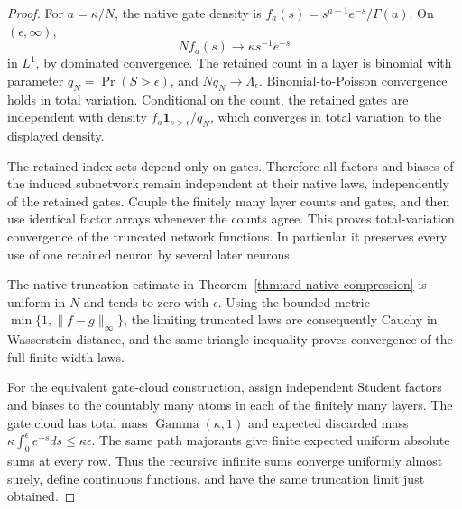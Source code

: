 \begin{proof}
For $a=\kappa/N$, the native gate density is
$f_a(s)=s^{a-1}e^{-s}/\Gamma(a)$. On $(\epsilon,\infty)$,
\[
 Nf_a(s)\longrightarrow\kappa s^{-1}e^{-s}
\]
in $L^1$, by dominated convergence. The retained count in a layer is binomial with parameter $q_N=\Pr(S>\epsilon)$, and $Nq_N\to\Lambda_\epsilon$. Binomial-to-Poisson convergence holds in total variation. Conditional on the count, the retained gates are independent with density $f_a\mathbf1_{s>\epsilon}/q_N$, which converges in total variation to the displayed density.

The retained index sets depend only on gates. Therefore all factors and biases of the induced subnetwork remain independent at their native laws, independently of the retained gates. Couple the finitely many layer counts and gates, and then use identical factor arrays whenever the counts agree. This proves total-variation convergence of the truncated network functions. In particular it preserves every use of one retained neuron by several later neurons.

The native truncation estimate in Theorem~\ref{thm:ard-native-compression} is uniform in $N$ and tends to zero with $\epsilon$. Using the bounded metric $\min\{1,\|f-g\|_\infty\}$, the limiting truncated laws are consequently Cauchy in Wasserstein distance, and the same triangle inequality proves convergence of the full finite-width laws.

For the equivalent gate-cloud construction, assign independent Student factors and biases to the countably many atoms in each of the finitely many layers. The gate cloud has total mass $\operatorname{Gamma}(\kappa,1)$ and expected discarded mass $\kappa\int_0^\epsilon e^{-s}ds\le\kappa\epsilon$. The same path majorants give finite expected uniform absolute sums at every row. Thus the recursive infinite sums converge uniformly almost surely, define continuous functions, and have the same truncation limit just obtained.
\end{proof}

